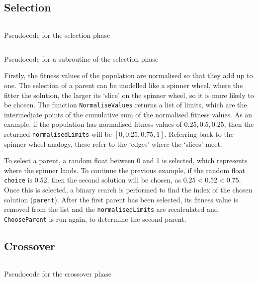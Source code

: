 \subsection{Selection}

\begin{listing}[!ht]
	\inputminted[linenos, fontsize=\footnotesize]{text}{code/select-parents.txt}
	\caption{Pseudocode for the selection phase}
	\label{listing:select-parents}
\end{listing}

\begin{listing}[!ht]
	\inputminted[linenos, fontsize=\footnotesize]{text}{code/choose-parent.txt}
	\caption{Pseudocode for a subroutine of the selection phase}
	\label{listing:choose-parent}
\end{listing}

Firstly, the fitness values of the population are normalised so that they add 
up to one. The selection of a parent can be modelled like a spinner wheel, where
the fitter the solution, the larger its `slice' on the spinner wheel, so it is 
more likely to be chosen.
The function \verb|NormaliseValues| returns a list of limits, which are the 
intermediate points of the cumulative sum of the normalised fitness values.
As an example, if the population has normalised fitness values of 
\( 0.25,0.5,0.25 \), then the returned \verb|normalisedLimits| will be 
\( [0,0.25,0.75,1] \).
Referring back to the spinner wheel analogy, these refer to the `edges' where 
the `slices' meet.

To select a parent, a random float between 0 and 1 is selected, which represents
where the spinner lands.
To continue the previous example, if the random float \verb|choice| is 0.52, 
then the second solution will be chosen, as \( 0.25 < 0.52 < 0.75 \).
Once this is selected, a binary search is performed to find the index of the 
chosen solution (\verb|parent|). After the first parent has been selected, its 
fitness value is removed from the list and the \verb|normalisedLimits| are 
recalculated and \verb|ChooseParent| is run again, to determine the second 
parent.

\subsection{Crossover}

\begin{listing}[!ht]
	\inputminted[linenos, fontsize=\footnotesize]{text}{code/crossover.txt}
	\caption{Pseudocode for the crossover phase}
	\label{listing:crossover}
\end{listing}

